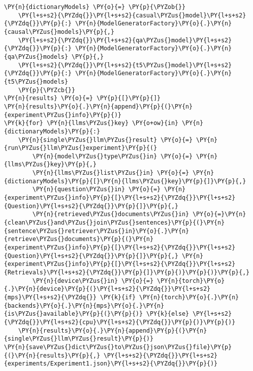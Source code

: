 \documentclass[11pt]{wseas}
\begin{document}
\begin{tcolorbox}[breakable, size=fbox, boxrule=1pt, pad at break*=1mm,colback=cellbackground, colframe=cellborder]
\begin{Verbatim}[commandchars=\\\{\}]
\PY{n}{dictionaryModels} \PY{o}{=} \PY{p}{\PYZob{}}
    \PY{l+s+s2}{\PYZdq{}}\PY{l+s+s2}{casual\PYZus{}model}\PY{l+s+s2}{\PYZdq{}}\PY{p}{:} \PY{n}{ModelGeneratorFactory}\PY{o}{.}\PY{n}{causal\PYZus{}models}\PY{p}{,} 
    \PY{l+s+s2}{\PYZdq{}}\PY{l+s+s2}{qa\PYZus{}model}\PY{l+s+s2}{\PYZdq{}}\PY{p}{:} \PY{n}{ModelGeneratorFactory}\PY{o}{.}\PY{n}{qa\PYZus{}models} \PY{p}{,}
    \PY{l+s+s2}{\PYZdq{}}\PY{l+s+s2}{t5\PYZus{}model}\PY{l+s+s2}{\PYZdq{}}\PY{p}{:} \PY{n}{ModelGeneratorFactory}\PY{o}{.}\PY{n}{t5\PYZus{}models} 
    \PY{p}{\PYZcb{}}
\PY{n}{results} \PY{o}{=} \PY{p}{[}\PY{p}{]}
\PY{n}{results}\PY{o}{.}\PY{n}{append}\PY{p}{(}\PY{n}{experiment\PYZus{}info}\PY{p}{)}
\PY{k}{for} \PY{n}{llms\PYZus{}key} \PY{o+ow}{in} \PY{n}{dictionaryModels}\PY{p}{:}
    \PY{n}{single\PYZus{}llm\PYZus{}result} \PY{o}{=} \PY{n}{run\PYZus{}llm\PYZus{}experiment}\PY{p}{(}
        \PY{n}{model\PYZus{}type\PYZus{}in} \PY{o}{=} \PY{n}{llms\PYZus{}key}\PY{p}{,}
        \PY{n}{llms\PYZus{}list\PYZus{}in} \PY{o}{=} \PY{n}{dictionaryModels}\PY{p}{[}\PY{n}{llms\PYZus{}key}\PY{p}{]}\PY{p}{,}
        \PY{n}{question\PYZus{}in} \PY{o}{=} \PY{n}{experiment\PYZus{}info}\PY{p}{[}\PY{l+s+s2}{\PYZdq{}}\PY{l+s+s2}{Question}\PY{l+s+s2}{\PYZdq{}}\PY{p}{]}\PY{p}{,}
        \PY{n}{retrieved\PYZus{}documents\PYZus{}in} \PY{o}{=}\PY{n}{clean\PYZus{}and\PYZus{}join\PYZus{}sentences}\PY{p}{(}\PY{n}{sentence\PYZus{}retriever\PYZus{}in}\PY{o}{.}\PY{n}{retrieve\PYZus{}documents}\PY{p}{(}\PY{n}{experiment\PYZus{}info}\PY{p}{[}\PY{l+s+s2}{\PYZdq{}}\PY{l+s+s2}{Question}\PY{l+s+s2}{\PYZdq{}}\PY{p}{]}\PY{p}{,} \PY{n}{experiment\PYZus{}info}\PY{p}{[}\PY{l+s+s2}{\PYZdq{}}\PY{l+s+s2}{Retrievals}\PY{l+s+s2}{\PYZdq{}}\PY{p}{]}\PY{p}{)}\PY{p}{)}\PY{p}{,}
        \PY{n}{device\PYZus{}in} \PY{o}{=} \PY{n}{torch}\PY{o}{.}\PY{n}{device}\PY{p}{(}\PY{l+s+s2}{\PYZdq{}}\PY{l+s+s2}{mps}\PY{l+s+s2}{\PYZdq{}} \PY{k}{if} \PY{n}{torch}\PY{o}{.}\PY{n}{backends}\PY{o}{.}\PY{n}{mps}\PY{o}{.}\PY{n}{is\PYZus{}available}\PY{p}{(}\PY{p}{)} \PY{k}{else} \PY{l+s+s2}{\PYZdq{}}\PY{l+s+s2}{cpu}\PY{l+s+s2}{\PYZdq{}}\PY{p}{)}\PY{p}{)}
    \PY{n}{results}\PY{o}{.}\PY{n}{append}\PY{p}{(}\PY{n}{single\PYZus{}llm\PYZus{}result}\PY{p}{)}
\PY{n}{save\PYZus{}dict\PYZus{}to\PYZus{}json\PYZus{}file}\PY{p}{(}\PY{n}{results}\PY{p}{,} \PY{l+s+s2}{\PYZdq{}}\PY{l+s+s2}{experiments/Experiment1.json}\PY{l+s+s2}{\PYZdq{}}\PY{p}{)}    
\end{Verbatim}
\end{tcolorbox}
\end{document}
